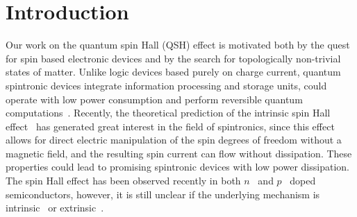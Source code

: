 \documentclass{article}
\begin{document}

\section{Introduction}
Our work on the quantum spin Hall (QSH) effect is motivated both by
the quest for spin based electronic devices and by the search for
topologically non-trivial states of matter. Unlike logic devices
based purely on charge current, quantum spintronic devices integrate
information processing and storage units, could operate with low
power consumption and perform reversible quantum
computations~\cite{prinz1998,wolf2001}. Recently, the theoretical
prediction of the intrinsic spin Hall
effect~\cite{murakami2003,sinova2004} has generated great interest
in the field of spintronics, since this effect allows for direct
electric manipulation of the spin degrees of freedom without a
magnetic field, and the resulting spin current can flow without
dissipation. These properties could lead to promising spintronic
devices with low power dissipation. The spin Hall effect has been
observed recently in both $n$~\cite{kato2004} and
$p$~\cite{wunderlich2005} doped semiconductors, however, it is still
unclear if the underlying mechanism is
intrinsic~\cite{murakami2003,sinova2004} or
extrinsic~\cite{dyakonov1971,hirsch1999}.
\end{document}
